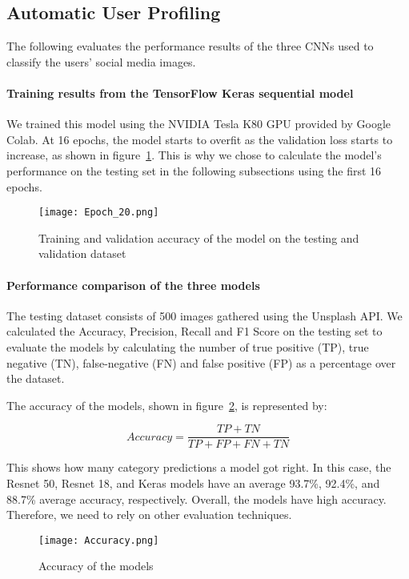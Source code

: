 \subsection{Automatic User Profiling} 

The following evaluates the performance results of the
three CNNs used to classify the users' social media images.

\paragraph{Training results from the TensorFlow Keras sequential model}

We trained this model using the NVIDIA Tesla K80 GPU provided by Google Colab. At 16 epochs,
the model starts to overfit as the validation loss starts to increase, as shown
in figure~\ref{kerasresults}. This is why we chose to calculate the model's performance on the
testing set in the following subsections using the first 16 epochs. 

\begin{figure}[h]
\centering
\texttt{[image: Epoch\_20.png]}
\caption{Training and validation accuracy of the model on the testing and validation dataset}
\label{kerasresults}
\end{figure}

\paragraph{Performance comparison of the three models}

The testing dataset consists of 500 images gathered using the Unsplash API. We
calculated the Accuracy, Precision, Recall and F1 Score on the testing set to
evaluate the models by calculating the number of true positive (TP), true
negative  (TN), false-negative (FN) and false positive (FP) as a
percentage over the dataset. 

The accuracy of the models, shown in figure~\ref{accuracy}, is represented by:

\[Accuracy = \frac{TP+TN}{TP+FP+FN+TN} \]

This shows how many category predictions a model got right. In this case, the Resnet 50,
Resnet 18, and Keras models have an average 93.7\%, 92.4\%, and 88.7\% average accuracy,
respectively. Overall, the models have high accuracy. Therefore, we need to rely on other
evaluation techniques.

\begin{figure}[h]
\centering
\texttt{[image: Accuracy.png]}
\caption{Accuracy of the models}
\label{accuracy}
\end{figure}

